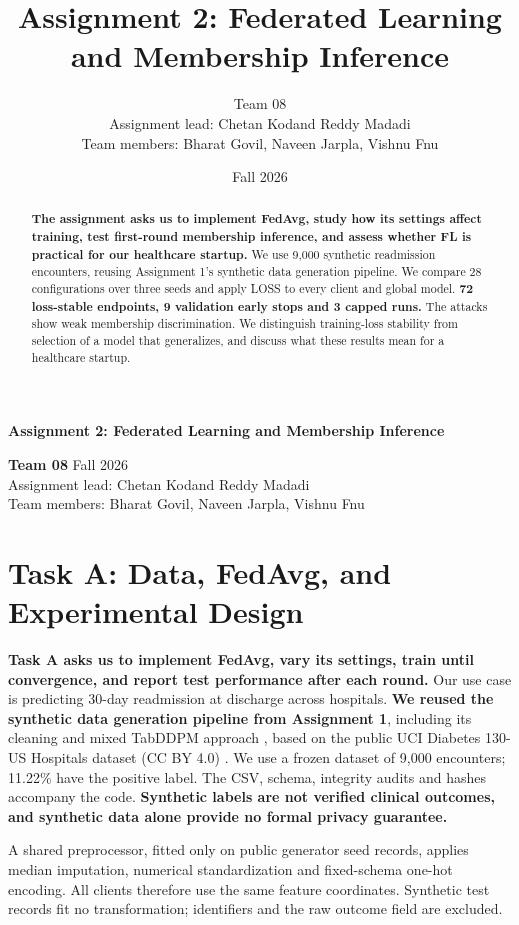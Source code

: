 \documentclass[10pt]{article}
\title{Assignment 2: Federated Learning and Membership Inference}
\author{Team 08 \\ Assignment lead: Chetan Kodand Reddy Madadi \\ Team members: Bharat Govil, Naveen Jarpla, Vishnu Fnu}
\date{Fall 2026}
\begin{document}
\begin{center}
{\Large\bfseries Assignment 2: Federated Learning and Membership Inference\par}
\vspace{4pt}
\textbf{Team 08} \hfill Fall 2026\\
Assignment lead: Chetan Kodand Reddy Madadi\\
Team members: Bharat Govil, Naveen Jarpla, Vishnu Fnu
\end{center}
\begin{abstract}
\textbf{The assignment asks us to implement FedAvg, study how its settings affect
training, test first-round membership inference, and assess whether FL is
practical for our healthcare startup.} We use 9,000 synthetic readmission
encounters, reusing Assignment 1's synthetic data generation pipeline. We compare
28 configurations over three seeds and apply LOSS to every client and global model. \textbf{72 loss-stable endpoints, 9 validation early stops and 3 capped runs.}
The attacks show weak membership discrimination. We distinguish training-loss
stability from selection of a model that generalizes, and discuss what these
results mean for a healthcare startup.
\end{abstract}

\section{Task A: Data, FedAvg, and Experimental Design}
\textbf{Task A asks us to implement FedAvg, vary its settings, train until convergence,
and report test performance after each round.}
Our use case is predicting 30-day readmission at discharge across hospitals.
\textbf{We reused the synthetic data generation pipeline from Assignment 1},
including its cleaning and mixed TabDDPM approach \cite{tabddpm}, based on the
public UCI Diabetes 130-US Hospitals dataset (CC BY 4.0) \cite{uci}.
We use a frozen dataset of 9,000 encounters; 11.22\% have the positive label.
The CSV, schema, integrity audits and hashes accompany the code.
\textbf{Synthetic labels are not verified clinical outcomes, and synthetic data
alone provide no formal privacy guarantee.}

A shared preprocessor, fitted only on public generator seed records, applies
median imputation, numerical standardization and fixed-schema one-hot encoding.
All clients therefore use the same feature coordinates. Synthetic test records
fit no transformation; identifiers and the raw outcome field are excluded.
\end{document}
